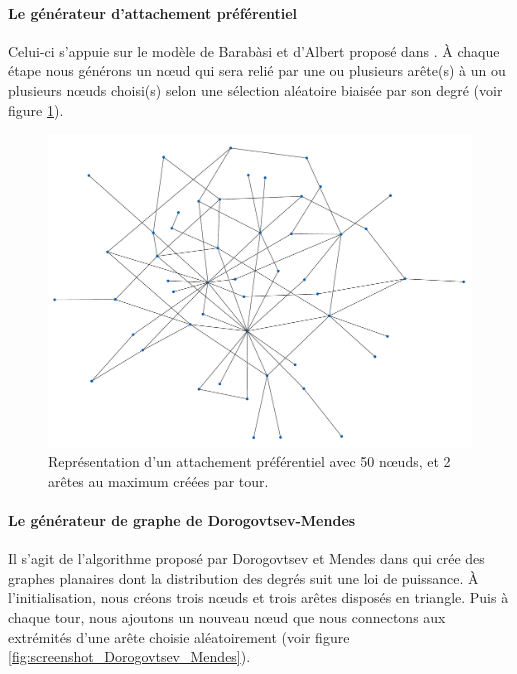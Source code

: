 \documentclass[a4paper, 10pt]{report}
\begin{document}
\paragraph{Le générateur d'attachement préférentiel}
Celui-ci s'appuie sur le modèle de Barabàsi et d'Albert proposé dans \cite{Barabasi1999Emergence}. À chaque étape nous générons un n\oe ud qui sera relié par une ou plusieurs arête(s) à un ou plusieurs n\oe uds choisi(s) selon une sélection aléatoire biaisée par son degré (voir figure \ref{fig:sceenshot_preferential_attachement}).

\begin{figure}[h!]
	\centering
	\includegraphics[width=1.\textwidth]{./img/sceenshot_preferential_attachement.pdf}
	\caption{Représentation d'un attachement préférentiel avec 50 n\oe uds, et 2 arêtes au maximum créées par tour.}
	\label{fig:sceenshot_preferential_attachement}
\end{figure}

\paragraph{Le générateur de graphe de Dorogovtsev-Mendes}Il s'agit de l'algorithme proposé par Dorogovtsev et Mendes dans \cite{Dorogovtsev2002evolution} qui crée des graphes planaires dont la distribution des degrés suit une loi de puissance. À l'initialisation, nous créons trois n\oe uds et trois arêtes disposés en triangle. Puis à chaque tour, nous ajoutons un nouveau n\oe ud que nous connectons aux extrémités d'une arête choisie aléatoirement (voir figure \ref{fig:screenshot_Dorogovtsev_Mendes}).
\end{document}

